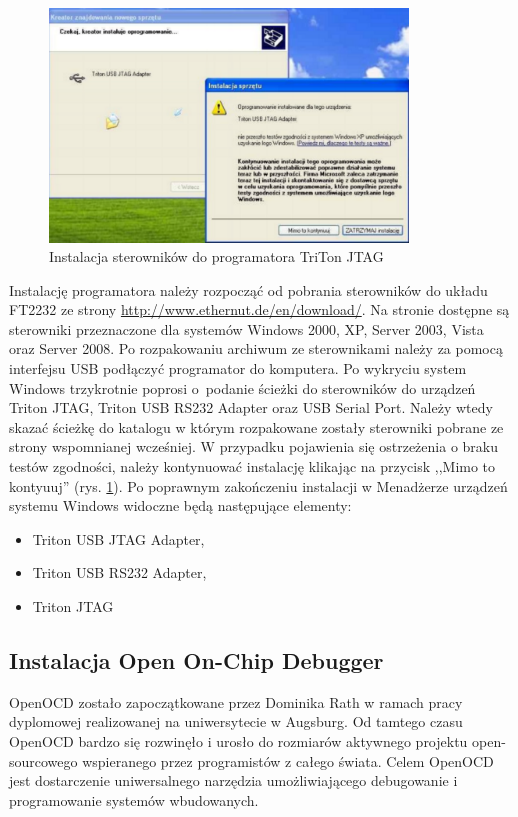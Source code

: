 \begin{figure}[h!]
 \centering
 \includegraphics[width=0.85\textwidth]{../images/ch03/jtag-install-s2.png}
 \caption{Instalacja sterowników do programatora TriTon JTAG}
 \label{fig:TritonInstall}
\end{figure}

Instalację programatora należy rozpocząć od pobrania sterowników do układu FT2232
ze strony \url{http://www.ethernut.de/en/download/}. Na stronie dostępne są
sterowniki przeznaczone dla systemów Windows 2000, XP, Server 2003, Vista oraz
Server 2008. Po rozpakowaniu archiwum ze sterownikami należy za pomocą interfejsu
USB podłączyć programator do komputera. Po wykryciu system Windows trzykrotnie
poprosi o~podanie ścieżki do sterowników do urządzeń Triton JTAG, Triton USB
RS232 Adapter oraz USB Serial Port. Należy wtedy skazać ścieżkę do katalogu w
którym rozpakowane zostały sterowniki pobrane ze strony wspomnianej wcześniej.
W przypadku pojawienia się ostrzeżenia o braku testów zgodności, należy
kontynuować instalację klikając na przycisk ,,Mimo to kontyuuj'' (rys.
\ref{fig:TritonInstall}). Po poprawnym zakończeniu instalacji w Menadżerze urządzeń
systemu Windows widoczne będą następujące elementy:
\begin{itemize}
\setlength{\parsep}{0pt}
\setlength{\itemsep}{0mm}
\setlength{\parskip}{0pt}
  \item Triton USB JTAG Adapter,
  \item Triton USB RS232 Adapter,
  \item Triton JTAG
\end{itemize}

\subsection{Instalacja Open On-Chip Debugger}
OpenOCD zostało zapoczątkowane przez Dominika Rath w ramach pracy dyplomowej
realizowanej na uniwersytecie w Augsburg. Od tamtego czasu OpenOCD bardzo się
rozwinęło i urosło do rozmiarów aktywnego projektu open-sourcowego wspieranego
przez programistów z całego świata. Celem OpenOCD jest dostarczenie
uniwersalnego narzędzia umożliwiającego debugowanie i programowanie systemów
wbudowanych.
 
